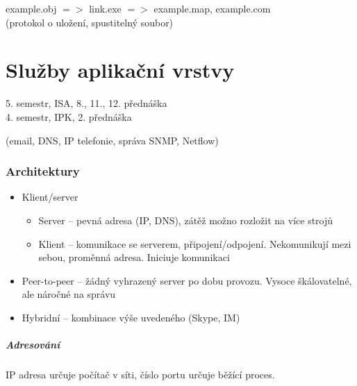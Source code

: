 \documentclass[a4wide]{report}
\begin{document}
example.obj $=>$ link.exe $=>$ example.map, example.com\\
 (protokol o uložení, spustitelný soubor)






























\chapter{Služby aplikační vrstvy} \label{cha:38}

5. semestr, ISA, 8., 11., 12. přednáška\\
4. semestr, IPK, 2. přednáška

(email, DNS, IP telefonie, správa SNMP, Netflow)

\subsection{Architektury}
\begin{itemize}
	\item Klient/server
	\begin{itemize}
		\item Server -- pevná adresa (IP, DNS), zátěž možno rozložit na více strojů
		\item Klient -- komunikace se serverem, připojení/odpojení. Nekomunikují mezi sebou, proměnná adresa. Iniciuje komunikaci
	\end{itemize}
	\item Peer-to-peer -- žádný vyhrazený server po dobu provozu. Vysoce škálovatelné, ale náročné na správu
	\item Hybridní -- kombinace výše uvedeného (Skype, IM)
\end{itemize}

\paragraph{Adresování} IP adresa určuje počítač v síti, číslo portu určuje běžící proces.
\end{document}
